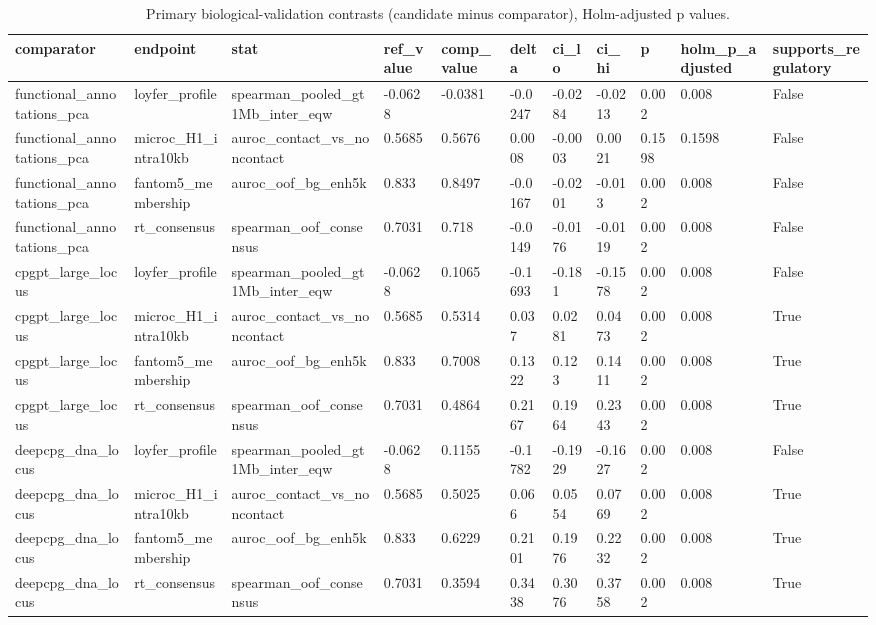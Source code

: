 \begin{table}[t]
\centering
\small
\begin{tabular}{lllllllllll}
\toprule
comparator & endpoint & stat & ref\_value & comp\_value & delta & ci\_lo & ci\_hi & p & holm\_p\_adjusted & supports\_regulatory \\
\midrule
functional\_annotations\_pca & loyfer\_profile & spearman\_pooled\_gt1Mb\_inter\_eqw & -0.0628 & -0.0381 & -0.0247 & -0.0284 & -0.0213 & 0.002 & 0.008 & False \\
functional\_annotations\_pca & microc\_H1\_intra10kb & auroc\_contact\_vs\_noncontact & 0.5685 & 0.5676 & 0.0008 & -0.0003 & 0.0021 & 0.1598 & 0.1598 & False \\
functional\_annotations\_pca & fantom5\_membership & auroc\_oof\_bg\_enh5k & 0.833 & 0.8497 & -0.0167 & -0.0201 & -0.013 & 0.002 & 0.008 & False \\
functional\_annotations\_pca & rt\_consensus & spearman\_oof\_consensus & 0.7031 & 0.718 & -0.0149 & -0.0176 & -0.0119 & 0.002 & 0.008 & False \\
cpgpt\_large\_locus & loyfer\_profile & spearman\_pooled\_gt1Mb\_inter\_eqw & -0.0628 & 0.1065 & -0.1693 & -0.181 & -0.1578 & 0.002 & 0.008 & False \\
cpgpt\_large\_locus & microc\_H1\_intra10kb & auroc\_contact\_vs\_noncontact & 0.5685 & 0.5314 & 0.037 & 0.0281 & 0.0473 & 0.002 & 0.008 & True \\
cpgpt\_large\_locus & fantom5\_membership & auroc\_oof\_bg\_enh5k & 0.833 & 0.7008 & 0.1322 & 0.123 & 0.1411 & 0.002 & 0.008 & True \\
cpgpt\_large\_locus & rt\_consensus & spearman\_oof\_consensus & 0.7031 & 0.4864 & 0.2167 & 0.1964 & 0.2343 & 0.002 & 0.008 & True \\
deepcpg\_dna\_locus & loyfer\_profile & spearman\_pooled\_gt1Mb\_inter\_eqw & -0.0628 & 0.1155 & -0.1782 & -0.1929 & -0.1627 & 0.002 & 0.008 & False \\
deepcpg\_dna\_locus & microc\_H1\_intra10kb & auroc\_contact\_vs\_noncontact & 0.5685 & 0.5025 & 0.066 & 0.0554 & 0.0769 & 0.002 & 0.008 & True \\
deepcpg\_dna\_locus & fantom5\_membership & auroc\_oof\_bg\_enh5k & 0.833 & 0.6229 & 0.2101 & 0.1976 & 0.2232 & 0.002 & 0.008 & True \\
deepcpg\_dna\_locus & rt\_consensus & spearman\_oof\_consensus & 0.7031 & 0.3594 & 0.3438 & 0.3076 & 0.3758 & 0.002 & 0.008 & True \\
\bottomrule
\end{tabular}
\caption{Primary biological-validation contrasts (candidate minus comparator), Holm-adjusted p values.}
\label{tab:s12}
\end{table}
